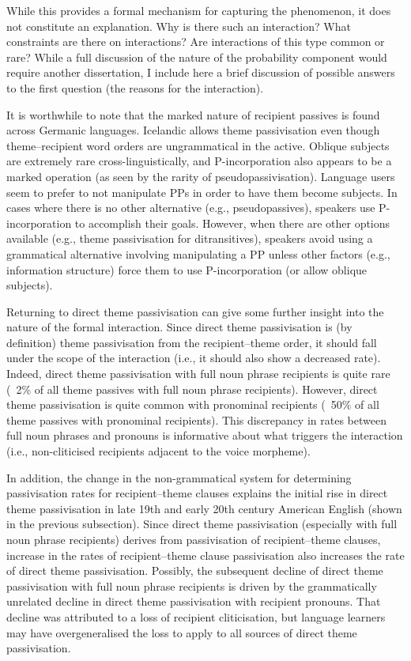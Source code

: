 	While this provides a formal mechanism for capturing the phenomenon, it does not constitute an explanation. Why is there such an interaction? What constraints are there on interactions? Are interactions of this type common or rare? While a full discussion of the nature of the probability component would require another dissertation, I include here a brief discussion of possible answers to the first question (the reasons for the interaction). 

	It is worthwhile to note that the marked nature of recipient passives is found across Germanic languages. Icelandic allows theme passivisation even though theme--recipient word orders are ungrammatical in the active. Oblique subjects are extremely rare cross-linguistically, and P-incorporation also appears to be a marked operation (as seen by the rarity of pseudopassivisation). Language users seem to prefer to not manipulate PPs in order to have them become subjects. In cases where there is no other alternative (e.g., pseudopassives), speakers use P-incorporation to accomplish their goals. However, when there are other options available (e.g., theme passivisation for ditransitives), speakers avoid using a grammatical alternative involving manipulating a PP unless other factors (e.g., information structure) force them to use P-incorporation (or allow oblique subjects). 

	Returning to direct theme passivisation can give some further insight into the nature of the formal interaction. Since direct theme passivisation is (by definition) theme passivisation from the recipient--theme order, it should fall under the scope of the interaction (i.e., it should also show a decreased rate). Indeed, direct theme passivisation with full noun phrase recipients is quite rare (~2\% of all theme passives with full noun phrase recipients). However, direct theme passivisation is quite common with pronominal recipients (~50\% of all theme passives with pronominal recipients). This discrepancy in rates between full noun phrases and pronouns is informative about what triggers the interaction (i.e., non-cliticised recipients adjacent to the voice morpheme).

	In addition, the change in the non-grammatical system for determining passivisation rates for recipient--theme clauses explains the initial rise in direct theme passivisation in late 19th and early 20th century American English (shown in the previous subsection). Since direct theme passivisation (especially with full noun phrase recipients) derives from passivisation of recipient--theme clauses, increase in the rates of recipient--theme clause passivisation also increases the rate of direct theme passivisation. Possibly, the subsequent decline of direct theme passivisation with full noun phrase recipients is driven by the grammatically unrelated decline in direct theme passivisation with recipient pronouns. That decline was attributed to a loss of recipient cliticisation, but language learners may have overgeneralised the loss to apply to all sources of direct theme passivisation.

